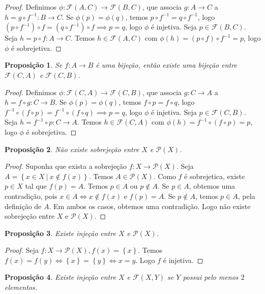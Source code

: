 \documentclass{article}
\newtheorem{prop}{Proposição}[section]
\theoremstyle{theorem}
\theoremstyle{lemma}
\theoremstyle{definition}
\theoremstyle{remark}
\begin{document}
\begin{proof}
	Definimos $\phi : \mathcal{F}(A, C) \to \mathcal{F}(B, C)$, que associa $g:A\to C$ a $h = g\circ f^{-1} :B\to C   $.  Se $\phi(p) = \phi(q)$, temos $p\circ f^{-1} = q \circ f^{-1}$, logo $(p\circ f^{-1} ) \circ f = (q\circ f^{-1})\circ f \implies p = q$, logo $\phi$ é injetiva. Seja $p \in \mathcal{F}(B,C)$. Seja $h = p\circ f : A\to C$. Temos $h\in \mathcal{F}(A,C)$ com $\phi(h) = (p\circ f)\circ f^{-1} = p$, logo $\phi$ é sobrejetiva.
\end{proof}
\begin{prop}
	Se $f:A\to B$ é uma bijeção, então existe uma bijeção entre $\mathcal{F}(C, A)$ e $\mathcal{F}(C,B)$.
\end{prop}
\begin{proof}
	Definimos $\phi : \mathcal{F}(C, A) \to \mathcal{F}(C, B)$, que associa $g:C\to A$ a $h = f\circ g :C\to B   $.  Se $\phi(p) = \phi(q)$, temos $f\circ p  = f\circ q $, logo $f^{-1} \circ (f\circ p ) = f^{-1} \circ (f\circ q )  \implies p = q$, logo $\phi$ é injetiva. Seja $p \in \mathcal{F}(C,B)$. Seja $h = f^{-1} \circ p  : C\to A$. Temos $h\in \mathcal{F}(C,A)$ com $\phi(h) = f^{-1} \circ (f\circ p)  = p$, logo $\phi$ é sobrejetiva.
\end{proof}
\begin{prop}
	Não existe sobrejeção entre $X$ e $\mathcal{P}( X)$.
\end{prop}
\begin{proof}
	Suponha que exista a sobrejeção $f: X \to \mathcal{P}(X)$. Seja $A = \left\{ x \in X \: | \: x\not\in f(x) \right\}$. Temos $A\in \mathcal{P}(X)$. Como $f$ é sobrejetica, existe $p\in X$ tal que $f(p) = A$.  Temos $p\in A$ ou $p\not \in A$. Se $p\in A$, obtemos uma contradição, pois $x \in A \iff x \not \in f(x)$ e $f(p) = A$. Se $p\not \in A$, temos $p\in A$, pela definição  de $A$. Em ambos os casos, obtemos uma contradição. Logo não existe sobrejeção entre $X$ e $\mathcal{P}(X)$.
\end{proof}
\begin{prop}
	Existe injeção entre $X$ e $\mathcal{P}( X)$.
\end{prop}
\begin{proof}
	Seja $f: X\to \mathcal{P}(X), f(x) = \left\{x\right\}$. Temos $f(x) = f(y) \iff \left\{ x\right\} = \left\{y\right\}  \iff x = y$. Logo $f$ é injetiva.
\end{proof}
\begin{prop}
	Existe injeção entre $X$ e $\mathcal{F}(X,Y)$ se $Y$ possui pelo menos $2$ elementos.
\end{prop}
\end{document}
